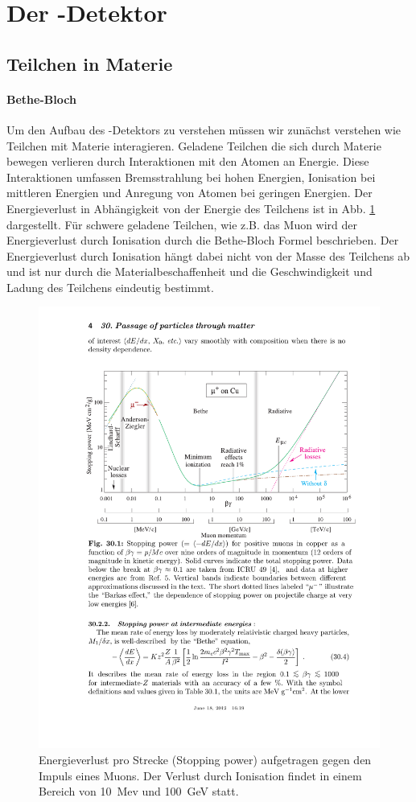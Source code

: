 \section{Der \atlas-Detektor}
\subsection{Teilchen in Materie}
\paragraph{Bethe-Bloch}
Um den Aufbau des \atlas-Detektors zu verstehen müssen wir zunächst verstehen wie Teilchen mit Materie interagieren. Geladene Teilchen die sich durch Materie bewegen verlieren durch Interaktionen mit den Atomen an Energie. Diese Interaktionen umfassen Bremsstrahlung bei hohen Energien, Ionisation bei mittleren Energien und Anregung von Atomen bei geringen Energien. Der Energieverlust in Abhängigkeit von der Energie des Teilchens ist in Abb. \ref{fig:bethe} dargestellt. Für schwere geladene Teilchen, wie z.B. das Muon wird der Energieverlust durch Ionisation durch die Bethe-Bloch Formel beschrieben\cite{Passage_through_matter}. Der Energieverlust durch Ionisation hängt dabei nicht von der Masse des Teilchens ab und ist nur durch die Materialbeschaffenheit und die Geschwindigkeit und Ladung des Teilchens eindeutig bestimmt. 
\begin{figure}
\centering
\includegraphics[scale=0.7]{./input/bethe.pdf}\caption{Energieverlust pro Strecke (Stopping power) aufgetragen gegen den Impuls eines Muons. Der Verlust durch Ionisation findet in einem Bereich von 10~Mev und 100~GeV statt\cite{Passage_through_matter}.}\label{fig:bethe}
\end{figure}
